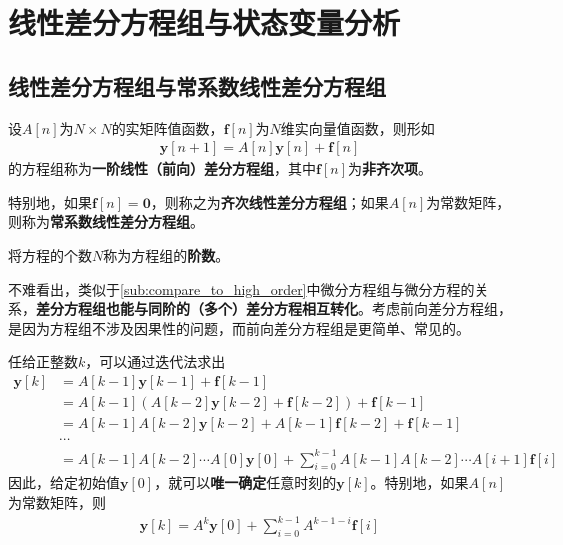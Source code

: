 \section{线性差分方程组与状态变量分析}\label{sec:Difference_Equation}

\subsection{线性差分方程组与常系数线性差分方程组}\label{sub:linear_difference_equation}

\begin{definition}[一阶线性差分方程组]
    设$A[n]$为$N\times N$的实矩阵值函数，$\mathbf{f}[n]$为$N$维实向量值函数，则形如
    \begin{align*}
        \mathbf{y}[n+1] = A[n] \mathbf{y}[n] + \mathbf{f}[n]
    \end{align*}
    的方程组称为\textbf{一阶线性（前向）差分方程组}，其中$\mathbf{f}[n]$为\textbf{非齐次项}。

    特别地，如果$\mathbf{f}[n]=\mathbf{0}$，则称之为\textbf{齐次线性差分方程组}；如果$A[n]$为常数矩阵，则称为\textbf{常系数线性差分方程组}。

    将方程的个数$N$称为方程组的\textbf{阶数}。
\end{definition}

不难看出，类似于\ref{sub:compare_to_high_order}中微分方程组与微分方程的关系，\textbf{差分方程组也能与同阶的（多个）差分方程相互转化}。考虑前向差分方程组，是因为方程组不涉及因果性的问题，而前向差分方程组是更简单、常见的。

任给正整数$k$，可以通过迭代法求出\begin{align*}
    \mathbf{y}[k] &= A[k-1] \mathbf{y}[k-1] + \mathbf{f}[k-1]\\
    & = A[k-1] (A[k-2] \mathbf{y}[k-2] + \mathbf{f}[k-2]) + \mathbf{f}[k-1]\\
    & = A[k-1] A[k-2] \mathbf{y}[k-2] + A[k-1] \mathbf{f}[k-2] + \mathbf{f}[k-1]\\
    & \cdots\\
    & = A[k-1] A[k-2] \cdots A[0] \mathbf{y}[0] + \sum_{i=0}^{k-1} A[k-1] A[k-2] \cdots A[i+1] \mathbf{f}[i]
\end{align*}
因此，给定初始值$\mathbf{y}[0]$，就可以\textbf{唯一确定}任意时刻的$\mathbf{y}[k]$。特别地，如果$A[n]$为常数矩阵，则\begin{align*}
    \mathbf{y}[k] = A^k \mathbf{y}[0] + \sum_{i=0}^{k-1} A^{k-1-i} \mathbf{f}[i]
\end{align*}

